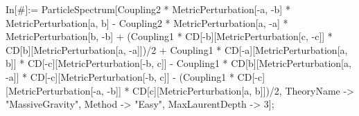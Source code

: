 In[#]:= ParticleSpectrum[Coupling2 * MetricPerturbation[-a, -b] * MetricPerturbation[a, b] - Coupling2 * MetricPerturbation[a, -a] * MetricPerturbation[b, -b] + (Coupling1 * CD[-b][MetricPerturbation[c, -c]] * CD[b][MetricPerturbation[a, -a]])/2 + Coupling1 * CD[-a][MetricPerturbation[a, b]] * CD[-c][MetricPerturbation[-b, c]] - Coupling1 * CD[b][MetricPerturbation[a, -a]] * CD[-c][MetricPerturbation[-b, c]] - (Coupling1 * CD[-c][MetricPerturbation[-a, -b]] * CD[c][MetricPerturbation[a, b]])/2, TheoryName -> "MassiveGravity", Method -> "Easy", MaxLaurentDepth -> 3]; 